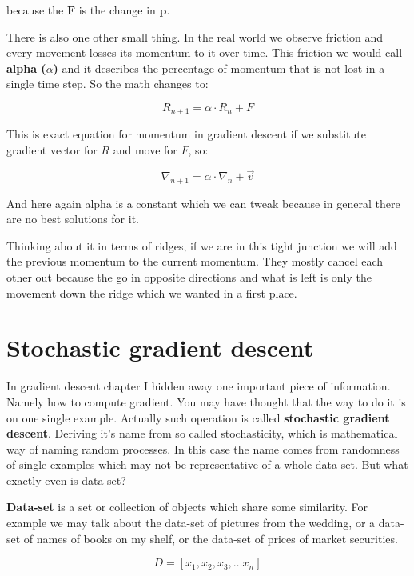 \noindent because the $\boldsymbol{F}$ is the change in $\boldsymbol{p}$.

\noindent There is also one other small thing. In the real world we observe friction and every movement losses its momentum to it over time. This friction we would call \textbf{alpha  ($\alpha$)} and it describes the percentage of momentum that is not lost in a single time step. So the math changes to:

\begin{equation}
	R_{n+1} =\alpha \cdot R_n + F
\end{equation}


This is exact equation for momentum in gradient descent if we substitute gradient vector for $R$ and move for $F$, so:

\begin{equation}
	\nabla_{n+1} = \alpha \cdot \nabla_n + \vec{v}
\end{equation}

And here again alpha is a constant which we can tweak because in general there are no best solutions for it.

Thinking about it in terms of ridges, if we are in this tight junction we will add the previous momentum to the current momentum. They mostly cancel each other out because the go in opposite directions and what is left is only the movement down the ridge which we wanted in a first place.


\section{Stochastic gradient descent}

In gradient descent chapter I hidden away one important piece of information. Namely how to compute gradient. You may have thought that the way to do it is on one single example. Actually such operation is called \textbf{stochastic gradient descent}. Deriving it’s name from so called stochasticity, which is mathematical way of naming random processes. In this case the name comes from randomness of single examples which may not be representative of a whole data set. But what exactly even is data-set?


\textbf{Data-set} is a set or collection of objects which share some similarity. For example we may talk about the data-set of pictures from the wedding, or a data-set of names of books on my shelf, or the data-set of prices of market securities.

\begin{equation*}
	D = [x_1, x_2, x_3,\ldots x_n]
\end{equation*}

